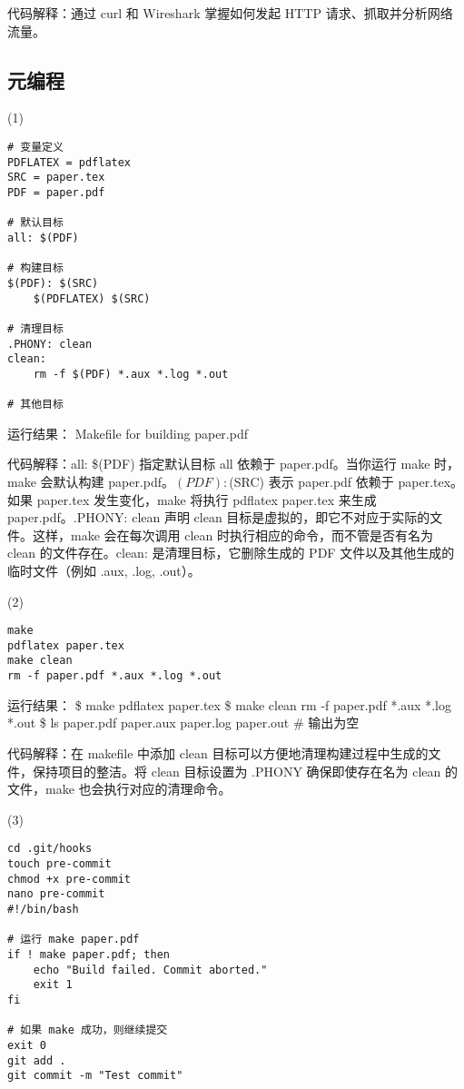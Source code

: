 \documentclass[a4paper, 12pt]{article}
\begin{document}
代码解释：通过 curl 和 Wireshark 掌握如何发起 HTTP 请求、抓取并分析网络流量。


  \subsection{元编程}
(1)
\begin{verbatim}
# 变量定义
PDFLATEX = pdflatex
SRC = paper.tex
PDF = paper.pdf

# 默认目标
all: $(PDF)

# 构建目标
$(PDF): $(SRC)
	$(PDFLATEX) $(SRC)

# 清理目标
.PHONY: clean
clean:
	rm -f $(PDF) *.aux *.log *.out

# 其他目标

\end{verbatim}

{\color{blue}
运行结果：
 Makefile for building paper.pdf
}

代码解释：all: \$(PDF) 指定默认目标 all 依赖于 paper.pdf。当你运行 make 时，make 会默认构建 paper.pdf。$(PDF): $(SRC) 表示 paper.pdf 依赖于 paper.tex。如果 paper.tex 发生变化，make 将执行 pdflatex paper.tex 来生成 paper.pdf。.PHONY: clean 声明 clean 目标是虚拟的，即它不对应于实际的文件。这样，make 会在每次调用 clean 时执行相应的命令，而不管是否有名为 clean 的文件存在。clean: 是清理目标，它删除生成的 PDF 文件以及其他生成的临时文件（例如 .aux, .log, .out）。

(2)
\begin{verbatim}
make
pdflatex paper.tex
make clean
rm -f paper.pdf *.aux *.log *.out
\end{verbatim}

{\color{blue}
运行结果：
\$ make
pdflatex paper.tex
\$ make clean
rm -f paper.pdf *.aux *.log *.out
\$ ls paper.pdf paper.aux paper.log paper.out
\# 输出为空
}

代码解释：在 makefile 中添加 clean 目标可以方便地清理构建过程中生成的文件，保持项目的整洁。将 clean 目标设置为 .PHONY 确保即使存在名为 clean 的文件，make 也会执行对应的清理命令。

(3)
\begin{verbatim}
cd .git/hooks
touch pre-commit
chmod +x pre-commit
nano pre-commit
#!/bin/bash

# 运行 make paper.pdf
if ! make paper.pdf; then
    echo "Build failed. Commit aborted."
    exit 1
fi

# 如果 make 成功，则继续提交
exit 0
git add .
git commit -m "Test commit"
\end{verbatim}
\end{document}
